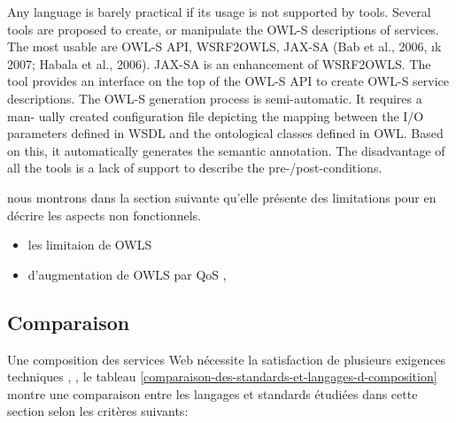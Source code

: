 {      Any language is barely practical if its usage is not supported
      by tools. Several tools are proposed to create, or manipulate
      the OWL-S descriptions of services.  The most usable are OWL-S
      API, WSRF2OWLS, JAX-SA (Bab  et al., 2006, ık 2007; Habala et
      al., 2006). JAX-SA is an enhancement of WSRF2OWLS. The tool
      provides an interface on the top of the OWL-S API to create
      OWL-S service descriptions. The OWL-S generation process is
      semi-automatic. It requires a man- ually created configuration
      file depicting the mapping between the I/O parameters defined in
      WSDL and the ontological classes defined in OWL. Based on this,
      it automatically generates the semantic annotation. The
      disadvantage of all the tools is a lack of support to describe
      the pre-/post-conditions.\cite{bartalos2011effective}

      nous montrons dans la section suivante qu’elle présente des
      limitations pour en décrire les aspects non
      fonctionnels.\cite{jean2012prise}

      \begin{itemize}
        \item les limitaion de OWLS \cite{jean2012prise}
        \item d'augmentation de OWLS par QoS \cite{baryannis2010},
          \cite{kritikos2009requirements}
      \end{itemize}
    }


    \subsection{Comparaison}
    \label{sec:langs-comparaison}   
    Une composition des services Web nécessite la satisfaction de
    plusieurs exigences techniques \cite{sheng2014web},
    \cite{bucchiarone2006survey}, le tableau
    \ref{comparaison-des-standards-et-langages-d-composition} montre
    une comparaison entre les langages et standards étudiées dans
    cette section selon les critères suivants:
    

